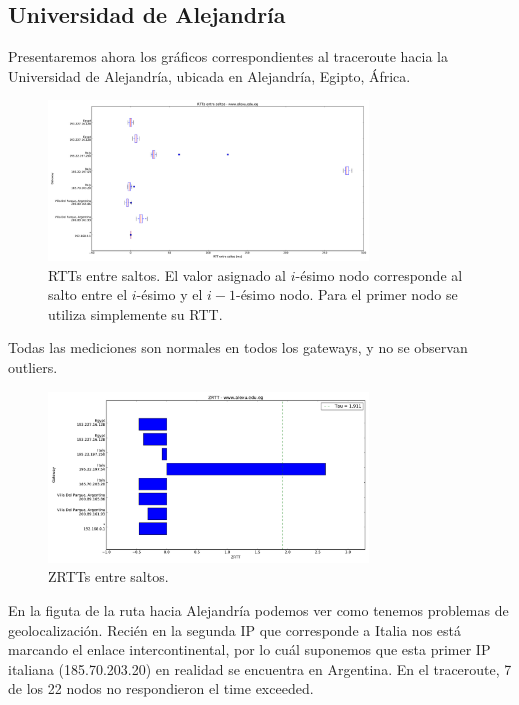 \subsection{Universidad de Alejandría}

Presentaremos ahora los gráficos correspondientes al traceroute hacia la Universidad de Alejandría, ubicada en Alejandría, Egipto, África.

\begin{figure}[H]
    \centering
    \includegraphics[width=8.5cm]{img/grafico1-www-alexu-edu-eg.pdf}
    \caption{\normalfont RTTs entre saltos. El valor asignado al $i$-ésimo nodo corresponde al salto entre el $i$-ésimo y el $i - 1$-ésimo nodo. Para el primer nodo se utiliza simplemente su RTT.}
\end{figure}

Todas las mediciones son normales en todos los gateways, y no se observan outliers. 

\begin{figure}[H]
    \centering
    \includegraphics[width=8.5cm]{img/grafico2-www-alexu-edu-eg.pdf}
    \caption{\normalfont ZRTTs entre saltos.}
\end{figure}
En la figuta de la ruta hacia Alejandría podemos ver como tenemos problemas de geolocalización. Recién en la segunda IP que corresponde 
a Italia nos está marcando el enlace intercontinental, por lo cuál suponemos que esta primer IP italiana (185.70.203.20) en realidad
se encuentra en Argentina. 
En el traceroute, 7 de los 22 nodos no respondieron el time exceeded. 


